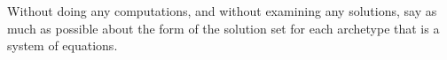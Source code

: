 Without doing any computations, and without examining any solutions, say as much as possible about the form of the solution set for each archetype that is a system of equations.\\
\\ 
\\ 
\\ 
\\ 
\\ 
\\ 
\\ 
\\ 
\\
